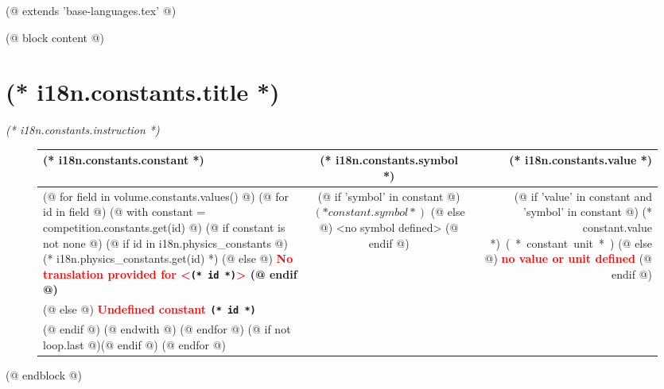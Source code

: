 (@ extends 'base-languages.tex' @)

(@ block content @)
    \pagestyle{constants}
    \renewcommand{\arraystretch}{1.3}
    \section{(* i18n.constants.title *)}
    \emph{(* i18n.constants.instruction *)}
    \vspace*{10mm}

    \begin{figure}[H]
        \centering
        \begin{tabular*}{\textwidth}{@{\extracolsep{\fill}} l c r}
            \toprule
                (* i18n.constants.constant *) & (* i18n.constants.symbol *) & (* i18n.constants.value *) \\
            \midrule
            (@ for field in volume.constants.values() @)
                (@ for id in field @)
                    (@ with constant = competition.constants.get(id) @)
                        (@ if constant is not none @)
                            (@ if id in i18n.physics_constants @)
                                (* i18n.physics_constants.get(id) *)
                            (@ else @)
                                \bf \textcolor{red}{No translation provided for <}\verb|(* id *)|\textcolor{red}{>}
                            (@ endif @) &
                            (@ if 'symbol' in constant @)
                                $(* constant.symbol *)$
                            (@ else @)
                                <no symbol defined>
                            (@ endif @) &
                            (@ if 'value' in constant and 'symbol' in constant @)
                                \SI[(@ if 'siextra' in constant @)(* constant.siextra *)(@ endif @)]{(* constant.value *)}{(* constant.unit *)}
                            (@ else @)
                                \textbf{\textcolor{red}{no value or unit defined}}
                            (@ endif @) \\
                        (@ else @)
                            \bf \textcolor{red}{Undefined constant} \verb|(* id *)| & & \\
                        (@ endif @)
                    (@ endwith @)
                (@ endfor @)
                (@ if not loop.last @)\midrule(@ endif @)
            (@ endfor @)
            \bottomrule
        \end{tabular*}
    \end{figure}
(@ endblock @)

